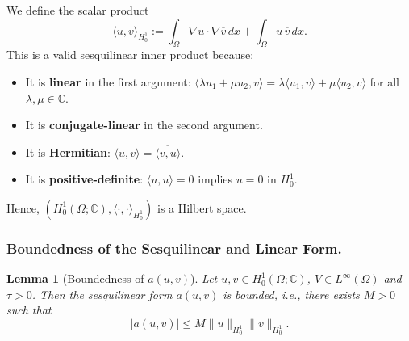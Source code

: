 \documentclass{article}
\theoremstyle{definition}
\theoremstyle{plain}
\newtheorem{lemma}[definition]{Lemma}
\theoremstyle{remark}
\begin{document}
We define the scalar product
\[
\langle u, v \rangle_{H_0^1} := \int_\Omega \nabla u \cdot \nabla \overline{v} \, dx + \int_\Omega u \, \overline{v} \, dx.
\]
This is a valid sesquilinear inner product because:
\begin{itemize}
  \item It is \textbf{linear} in the first argument: $\langle \lambda u_1 + \mu u_2, v \rangle = \lambda \langle u_1, v \rangle + \mu \langle u_2, v \rangle$ for all $\lambda, \mu \in \mathbb{C}$.
  \item It is \textbf{conjugate-linear} in the second argument.
  \item It is \textbf{Hermitian}: $\langle u, v \rangle = \overline{\langle v, u \rangle}$.
  \item It is \textbf{positive-definite}: $\langle u, u \rangle = 0$ implies $u = 0$ in $H_0^1$.
\end{itemize}
Hence, $(H_0^1(\Omega; \mathbb{C}), \langle \cdot, \cdot \rangle_{H_0^1})$ is a Hilbert space.

\subsubsection*{Boundedness of the Sesquilinear and Linear Form.}

\begin{lemma}[Boundedness of $a(u, v)$]
Let $u, v \in H_0^1(\Omega; \mathbb{C})$, $V \in L^\infty(\Omega)$ and $\tau > 0$. Then the sesquilinear form $a(u, v)$ is bounded, i.e., there exists $M > 0$ such that
\[
|a(u, v)| \leq M \|u\|_{H_0^1} \|v\|_{H_0^1}.
\]
\end{lemma}
\end{document}
